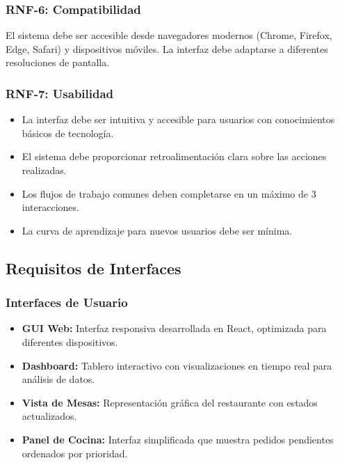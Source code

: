 \documentclass[12pt]{article}
\begin{document}
\subsubsection{RNF-6: Compatibilidad}
El sistema debe ser accesible desde navegadores modernos (Chrome, Firefox, Edge, Safari) y dispositivos móviles. La interfaz debe adaptarse a diferentes resoluciones de pantalla.

\subsubsection{RNF-7: Usabilidad}
\begin{itemize}
  \item La interfaz debe ser intuitiva y accesible para usuarios con conocimientos básicos de tecnología.
  \item El sistema debe proporcionar retroalimentación clara sobre las acciones realizadas.
  \item Los flujos de trabajo comunes deben completarse en un máximo de 3 interacciones.
  \item La curva de aprendizaje para nuevos usuarios debe ser mínima.
\end{itemize}

\subsection{Requisitos de Interfaces}

\subsubsection{Interfaces de Usuario}
\begin{itemize}
  \item \textbf{GUI Web:} Interfaz responsiva desarrollada en React, optimizada para diferentes dispositivos.
  \item \textbf{Dashboard:} Tablero interactivo con visualizaciones en tiempo real para análisis de datos.
  \item \textbf{Vista de Mesas:} Representación gráfica del restaurante con estados actualizados.
  \item \textbf{Panel de Cocina:} Interfaz simplificada que muestra pedidos pendientes ordenados por prioridad.
\end{itemize}
\end{document}
